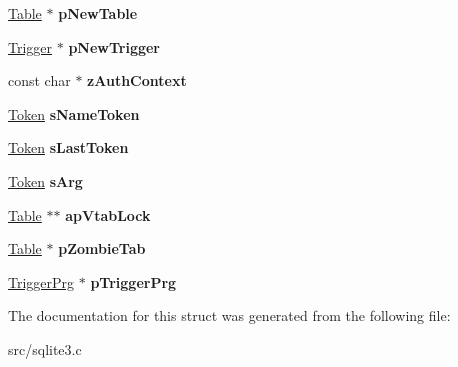 \begin{DoxyCompactItemize}
\item 
\hypertarget{struct_parse_a4788769c077dc86ffa3ee1e40ed6b4a1}{\hyperlink{struct_table}{Table} $\ast$ {\bfseries p\-New\-Table}}\label{struct_parse_a4788769c077dc86ffa3ee1e40ed6b4a1}

\item 
\hypertarget{struct_parse_a92ea8f2ac3190dd7c8360e0334ae78b3}{\hyperlink{struct_trigger}{Trigger} $\ast$ {\bfseries p\-New\-Trigger}}\label{struct_parse_a92ea8f2ac3190dd7c8360e0334ae78b3}

\item 
\hypertarget{struct_parse_a12c6e2fb69848bcc57169d44993c351f}{const char $\ast$ {\bfseries z\-Auth\-Context}}\label{struct_parse_a12c6e2fb69848bcc57169d44993c351f}

\item 
\hypertarget{struct_parse_afd929c54566cfc4d6f748fcc6b79b973}{\hyperlink{struct_token}{Token} {\bfseries s\-Name\-Token}}\label{struct_parse_afd929c54566cfc4d6f748fcc6b79b973}

\item 
\hypertarget{struct_parse_ad499020d1bf06f3c98c8d36e2ceb83fd}{\hyperlink{struct_token}{Token} {\bfseries s\-Last\-Token}}\label{struct_parse_ad499020d1bf06f3c98c8d36e2ceb83fd}

\item 
\hypertarget{struct_parse_aa3fe38b31dd1cd0fbea4de0e77891642}{\hyperlink{struct_token}{Token} {\bfseries s\-Arg}}\label{struct_parse_aa3fe38b31dd1cd0fbea4de0e77891642}

\item 
\hypertarget{struct_parse_acdfd318c0f04ec640d6affc85ef8a009}{\hyperlink{struct_table}{Table} $\ast$$\ast$ {\bfseries ap\-Vtab\-Lock}}\label{struct_parse_acdfd318c0f04ec640d6affc85ef8a009}

\item 
\hypertarget{struct_parse_a4e8319f0a7f0d21e472c13ac6cf67060}{\hyperlink{struct_table}{Table} $\ast$ {\bfseries p\-Zombie\-Tab}}\label{struct_parse_a4e8319f0a7f0d21e472c13ac6cf67060}

\item 
\hypertarget{struct_parse_a0891dbd3b583594c5d07d7b061026ea4}{\hyperlink{struct_trigger_prg}{Trigger\-Prg} $\ast$ {\bfseries p\-Trigger\-Prg}}\label{struct_parse_a0891dbd3b583594c5d07d7b061026ea4}

\end{DoxyCompactItemize}


The documentation for this struct was generated from the following file\-:\begin{DoxyCompactItemize}
\item 
src/sqlite3.\-c\end{DoxyCompactItemize}

